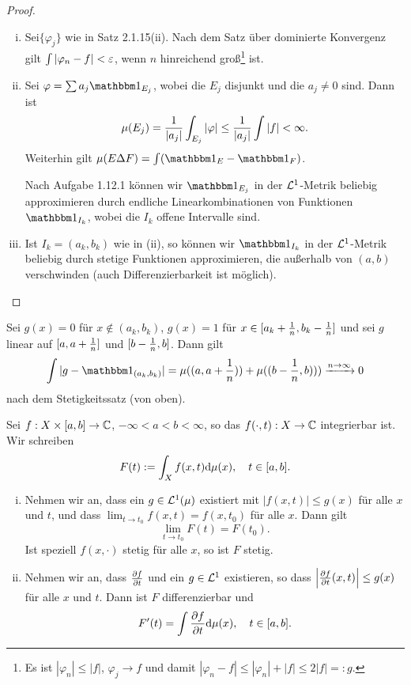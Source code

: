 \begin{proof}
 \begin{enumerate}[(i)]
  \item Sei$\{ \varphi_j \}$ wie in Satz 2.1.15(ii). Nach dem Satz über dominierte Konvergenz gilt $\int |\varphi_n - f| < \varepsilon$, wenn $n$ hinreichend groß\footnote{Es ist $|\varphi_n| \le |f|$, $\varphi_j \to f$ und damit $| \varphi_n - f| \le |\varphi_n| + |f| \le 2 |f| =: g$.} ist.
  \item Sei $\varphi = \sum a_j \ind_{E_j}$, wobei die $E_j$ disjunkt und die $a_j \ne 0$ sind. Dann ist 
  \[ \mu(E_j)  = \frac{1}{|a_j|} \int_{E_j} |\varphi| \le \frac{1}{|a_j|} \int |f| < \infty. \]
  Weiterhin gilt $\mu( E \Delta F ) = \int( \ind_E - \ind_F )$. 
  
  Nach Aufgabe 1.12.1 können wir $\ind_{E_j}$ in der $\mathcal{L}^1$-Metrik beliebig approximieren durch endliche Linearkombinationen von Funktionen $\ind_{I_k}$, wobei die $I_k$ offene Intervalle sind.
  \item Ist $I_k = (a_k, b_k)$ wie in (ii), so können wir $\ind_{I_k}$ in der $\mathcal{L}^1$-Metrik beliebig durch stetige Funktionen approximieren, die außerhalb von $(a,b)$ verschwinden (auch Differenzierbarkeit ist möglich). \qedhere
 \end{enumerate}
\end{proof}

\begin{exmp*}
 Sei $g(x) = 0$ für $x \notin (a_k,b_k)$, $g(x) = 1$ für $x \in [a_k + \frac{1}{n}, b_k - \frac{1}{n}]$ und sei $g$ linear auf $[a, a + \frac{1}{n}]$ und $[b-\frac{1}{n},b]$. Dann gilt
 \[ \int | g - \ind_{(a_k,b_k)} | = \mu(( a, a+\rez{n})) + \mu( (b-\rez{n},b) )) \xrightarrow{n \to \infty} 0 \]
 nach dem Stetigkeitssatz (von oben).
\end{exmp*}

\begin{thm}
 Sei $f:X \times [a,b] \to \mathbb{C}$, $-\infty < a < b < \infty$, so das $f( \cdot, t ) : X \to \mathbb{C}$ integrierbar ist. Wir schreiben
 \[ F(t) := \int_X f( x, t ) \mathrm{d} \mu(x), \quad t \in [a,b]. \]
 \begin{enumerate}[(i)]
  \item Nehmen wir an, dass ein $g \in \mathcal{L}^1(\mu)$ existiert mit $|f(x,t)| \le g(x)$ für alle $x$ und $t$, und dass $\lim_{t \to t_0} f(x,t) = f(x,t_0)$ für alle $x$. Dann gilt
  \[ \lim_{t \to t_0} F(t) = F(t_0). \]
  Ist speziell $f(x, \cdot)$ stetig für alle $x$, so ist $F$ stetig.
  \item Nehmen wir an, dass $\frac{\partial f}{\partial t}$ und ein $g \in \mathcal{L}^1$ existieren, so dass $\left| \frac{\partial f}{\partial t} (x,t) \right| \le g(x)$ für alle $x$ und $t$. Dann ist $F$ differenzierbar und 
  \[ F'(t) = \int \frac{\partial f}{\partial t} \mathrm{d} \mu(x), \quad t \in [a,b]. \]
 \end{enumerate}
\end{thm}

